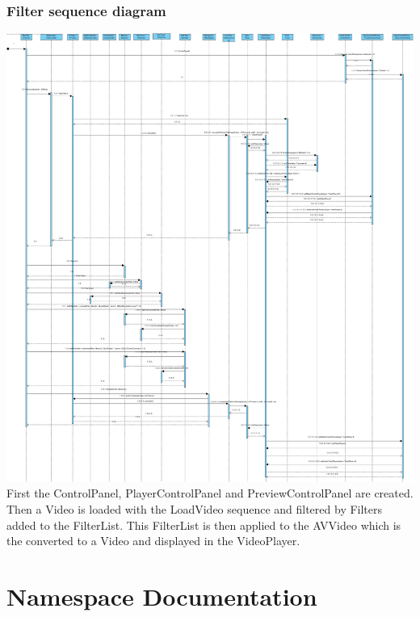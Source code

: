 \documentclass[twoside]{book}
\newcommand{\+}{\discretionary{\mbox{\scriptsize$\hookleftarrow$}}{}{}}
\begin{document}
\subsection*{Filter sequence diagram}
{\centering\includegraphics[width=1\textwidth]{SequenceDiagram3.jpg}}\\
First the ControlPanel, PlayerControlPanel and PreviewControlPanel are created. Then a Video is loaded with the LoadVideo sequence and filtered by Filters added to the FilterList. This FilterList is then applied to the AVVideo which is the converted to a Video and displayed in the VideoPlayer.
\chapter{Namespace Documentation}





\end{document}
